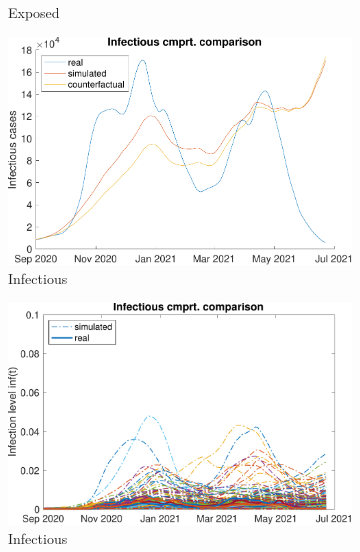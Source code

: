 \begin{figure}[hbtp]
\begin{subfigure}[b]{.45\linewidth}
         \caption{Exposed}
         \label{fig:compCombWave23Exp}
     \end{subfigure}
     \newline
     \begin{subfigure}[b]{.45\linewidth}
         \centering
         \includegraphics[width=\linewidth]{img/210907_224622_combined_wave23/figures/COMP_inf}
         \caption{Infectious}
         \label{fig:compAggrCombWave23Inf}
     \end{subfigure}
     \hfill
     \begin{subfigure}[b]{.45\linewidth}
         \centering
         \includegraphics[width=\linewidth]{img/210907_224622_combined_wave23/figures/SEIR_i_sim-vs-real}
         \caption{Infectious}
         \label{fig:compCombWave23Inf}
     \end{subfigure}
     \newline
     \begin{subfigure}[b]{.45\linewidth}

\end{subfigure}
\end{figure}
